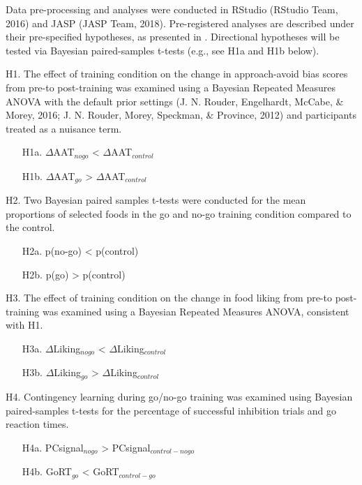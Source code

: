 \documentclass[man,floatsintext]{apa6}
\begin{document}
\par

Data pre-processing and analyses were conducted in RStudio (RStudio
Team, 2016) and JASP (JASP Team, 2018). Pre-registered analyses are
described under their pre-specified hypotheses, as presented in
\textit{}. Directional hypotheses will be tested via
Bayesian paired-samples t-tests (e.g., see H1a and H1b below).

\noindent H1. The effect of training condition on the change in
approach-avoid bias scores from pre-to post-training was examined using
a Bayesian Repeated Measures ANOVA with the default prior settings (J.
N. Rouder, Engelhardt, McCabe, \& Morey, 2016; J. N. Rouder, Morey,
Speckman, \& Province, 2012) and participants treated as a nuisance
term.

\begin{itemize}
\item[H1a.] $\Delta$AAT$_{nogo}$ <  $\Delta$AAT$_{control}$  
\item[H1b.] $\Delta$AAT$_{go}$ >  $\Delta$AAT$_{control}$
\end{itemize}

\noindent H2. Two Bayesian paired samples t-tests were conducted for the
mean proportions of selected foods in the go and no-go training
condition compared to the control.

\begin{itemize}
\item[H2a.] p(no-go) < p(control)
\item[H2b.] p(go) > p(control)
\end{itemize}

\noindent H3. The effect of training condition on the change in food
liking from pre-to post-training was examined using a Bayesian Repeated
Measures ANOVA, consistent with H1.

\begin{itemize}
\item[H3a.] $\Delta$Liking$_{nogo}$ < $\Delta$Liking$_{control}$
\item[H3b.] $\Delta$Liking$_{go}$ > $\Delta$Liking$_{control}$
\end{itemize}

\noindent H4. Contingency learning during go/no-go training was examined
using Bayesian paired-samples t-tests for the percentage of successful
inhibition trials and go reaction times.

\begin{itemize}
\item[H4a.] PCsignal$_{nogo}$ > PCsignal$_{control-nogo}$
\item[H4b.] GoRT$_{go}$ < GoRT$_{control-go}$
\end{itemize}
\end{document}
